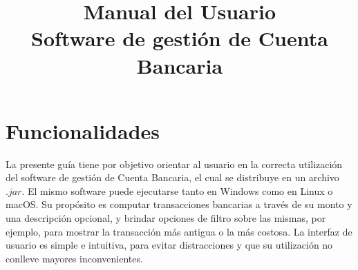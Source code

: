 \documentclass[11pt]{article}
\title{%
    \Huge \vspace{60mm}\textbf{Manual del Usuario} \\
    \huge Software de gestión de Cuenta Bancaria}
\date{}
\begin{document}
\maketitle
\thispagestyle{empty}
\newpage
\section{Funcionalidades}
La presente guía tiene por objetivo orientar al usuario en la correcta utilización del software de gestión de Cuenta Bancaria, el cual se distribuye en un archivo \(.jar\). El mismo software puede ejecutarse tanto en Windows como en Linux o macOS. Su propósito es computar transacciones bancarias a través de su monto y una descripción opcional, y brindar opciones de filtro sobre las mismas, por ejemplo, para mostrar la transacción más antigua o la más costosa. La interfaz de usuario es simple e intuitiva, para evitar distracciones y que su utilización no conlleve mayores inconvenientes.
\end{document}
